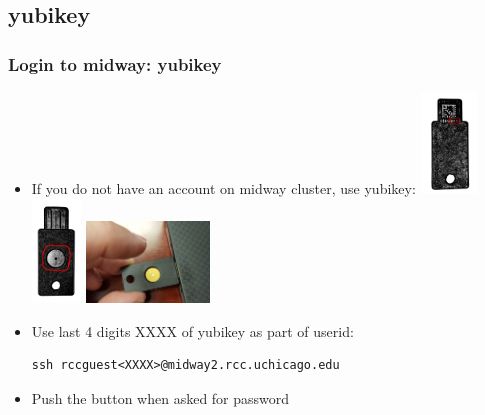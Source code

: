 \subsection{yubikey}
\begin{frame}[fragile]
  \frametitle{Login to midway: yubikey}
  \begin{itemize}
  \item {\color{mycolordef}If you do not have an account on midway cluster}, use {\color{mycolordef}yubikey}:
    \includegraphics[width=1.5cm]{icons/yubikey1a.jpg}
    \includegraphics[width=1.3cm]{icons/yubikey2a.jpg}
    \includegraphics[width=3.3cm]{icons/yubikey3a.jpg}
  \item Use last 4 digits XXXX of yubikey as part of userid:
    {\color{mycolorcli}
\begin{verbatim}
ssh rccguest<XXXX>@midway2.rcc.uchicago.edu
\end{verbatim}
    }
  \item Push the button when asked for password
  \end{itemize}
\end{frame}

